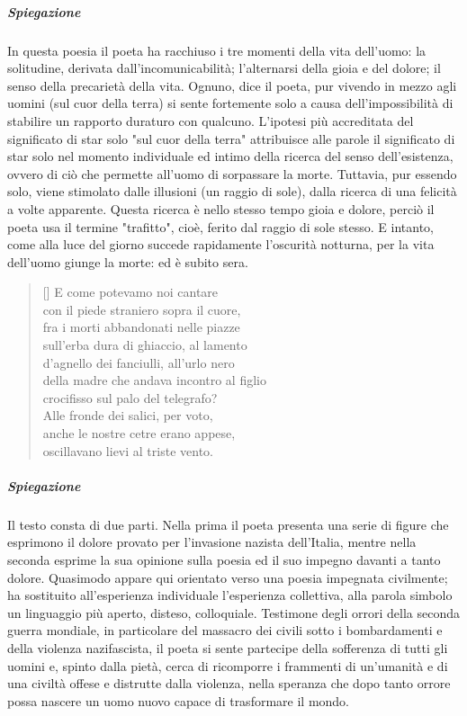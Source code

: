 \documentclass[10pt]{report}
\begin{document}
		\subparagraph[Ed è subito sera]{Spiegazione}
		In questa poesia il poeta ha racchiuso i tre momenti della vita dell'uomo: la solitudine, derivata dall'incomunicabilità; l'alternarsi della gioia e del dolore; il senso della precarietà della vita. Ognuno, dice il poeta, pur vivendo in mezzo agli uomini (sul cuor della terra) si sente fortemente solo a causa dell'impossibilità di stabilire un rapporto duraturo con qualcuno. L'ipotesi più accreditata del significato di star solo "sul cuor della terra" attribuisce alle parole il significato di star solo nel momento individuale ed intimo della ricerca del senso dell'esistenza, ovvero di ciò che permette all'uomo di sorpassare la morte. Tuttavia, pur essendo solo, viene stimolato dalle illusioni (un raggio di sole), dalla ricerca di una felicità a volte apparente. Questa ricerca è nello stesso tempo gioia e dolore, perciò il poeta usa il termine "trafitto", cioè, ferito dal raggio di sole stesso. E intanto, come alla luce del giorno succede rapidamente l'oscurità notturna, per la vita dell'uomo giunge la morte: ed è subito sera.
	
		\renewcommand{\poemtoc}{subsection}
		\settowidth{\versewidth}{There was an old party of Lyme}
		\begin{verse}[\versewidth]
			E come potevamo noi cantare\\
			con il piede straniero sopra il cuore,\\
			fra i morti abbandonati nelle piazze\\
			sull’erba dura di ghiaccio, al lamento\\
			d’agnello dei fanciulli, all’urlo nero\\
			della madre che andava incontro al figlio\\
			crocifisso sul palo del telegrafo?\\
			Alle fronde dei salici, per voto,\\
			anche le nostre cetre erano appese,\\
			oscillavano lievi al triste vento.\\
		\end{verse}
	
			\subparagraph[Alle fronte dei salici]{Spiegazione}
		Il testo consta di due parti. Nella prima il poeta presenta una serie di figure che esprimono il dolore provato per l'invasione nazista dell'Italia, mentre nella seconda esprime la sua opinione sulla poesia ed il suo impegno davanti a tanto dolore.
		Quasimodo appare qui orientato verso una poesia impegnata civilmente; ha sostituito all’esperienza individuale l’esperienza collettiva, alla parola simbolo un linguaggio più aperto, disteso, colloquiale. Testimone degli orrori della seconda guerra mondiale, in particolare del massacro dei civili sotto i bombardamenti e della violenza nazifascista, il poeta si sente partecipe della sofferenza di tutti gli uomini e, spinto dalla pietà, cerca di ricomporre i frammenti di un’umanità e di una civiltà offese e distrutte dalla violenza, nella speranza che dopo tanto orrore possa nascere un uomo nuovo capace di trasformare il mondo.
		
\end{document}
